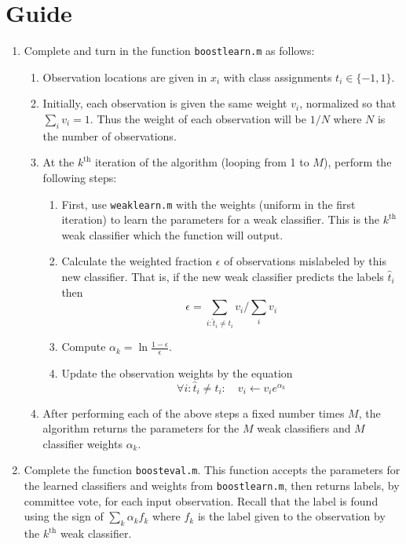 \documentclass[11pt,noanswers,addpoints]{exam}
\begin{document}
\section{Guide}
\begin{enumerate}
\item Complete and turn in the function \texttt{boostlearn.m} as follows:
\begin{enumerate}
\item Observation locations are given in $x_i$ with 
class assignments $t_i \in \{-1,1\}$. 
\item Initially, each observation
is given the same weight $v_i$, normalized so that $\sum_i v_i = 1$. Thus the weight of
each observation will be $1/N$ where $N$ is the number of observations.
\item At the $k^{\text{th}}$ iteration of the algorithm (looping from 1 to $M$), perform the following steps:
\begin{enumerate}
\item First, use \texttt{weaklearn.m} with the weights (uniform in the first iteration)
 to learn the parameters for a weak classifier. This is the $k^{\text{th}}$ weak classifier which
 the function will output.
\item Calculate the weighted fraction $\epsilon$ of observations mislabeled by this new classifier. That is,
if the new weak classifier predicts the labels $\hat{t}_i$ then 
$$\epsilon = \sum_{i\colon\hat{t}_i \neq t_i} v_i / \sum_i v_i $$
\item Compute $\alpha_k = \ln{\frac{1 - \epsilon}{\epsilon}}$.
\item Update the observation weights by the equation
$$\forall i\colon \hat{t}_i \neq t_i\colon \quad v_i \leftarrow v_i e^{\alpha_k}$$ 

\end{enumerate}
\item After performing each of the above steps a fixed number times $M$, the algorithm returns the parameters for 
the $M$ weak classifiers and $M$ classifier weights $\alpha_k$.
\end{enumerate}

\item Complete the function \texttt{boosteval.m}. This function accepts the parameters for the learned
classifiers and weights from \texttt{boostlearn.m}, then returns labels, by committee vote, for each input
observation. Recall that the label is found using the sign of $\sum_k \alpha_k f_k$ where $f_k$ is the label
given to the observation by the $k^{\text{th}}$ weak classifier.


\end{enumerate}
\end{document}
